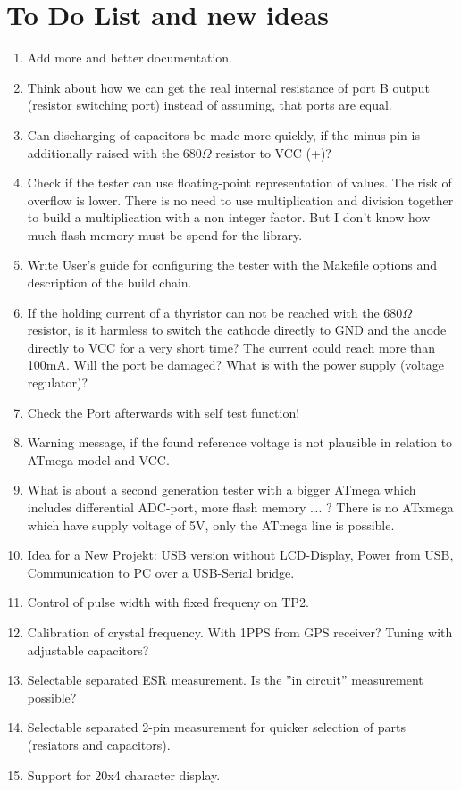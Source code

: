 
\chapter{To Do List and new ideas}
\label{sec:todo}

\begin{enumerate}
\item Add more and better documentation.
\item Think about how we can get the real internal resistance of port B output (resistor switching port) instead of assuming, that ports are equal.
\item Can discharging of capacitors be made more quickly, if the minus pin is additionally raised
with the \(680\Omega\) resistor to VCC (+)?
\item Check if the tester can use floating-point representation of  values. The risk of overflow  is lower.
There is no need to use multiplication and division together to build a multiplication with a non integer factor.
But I don't know how much flash memory must be spend for the library.
\item Write User's guide for configuring the tester with the Makefile options and description of the build chain.
\item If the holding current of a thyristor can not be reached with the \(680\Omega\) resistor, is it harmless to switch the cathode directly to GND
and the anode directly to VCC for a very short time?
The current could reach more than 100mA. Will the port be damaged? What is with the power supply (voltage regulator)?
\item Check the Port afterwards with self test function!
\item Warning message, if the found reference voltage is not plausible in relation to ATmega model and VCC.
\item What is about a second generation tester with a bigger ATmega which includes differential ADC-port, more flash memory …. ?
There is no ATxmega which have supply voltage of 5V, only the ATmega line  is possible. 
\item Idea for a New Projekt: USB  version without LCD-Display, Power from USB, Communication to PC over a USB-Serial bridge.
\item Control of pulse width with fixed frequeny on TP2.
\item Calibration of crystal frequency. With 1PPS from GPS receiver? Tuning with adjustable capacitors?
\item Selectable separated ESR measurement. Is the ''in circuit'' measurement possible?
\item Selectable separated 2-pin measurement for quicker selection of parts (resiators and capacitors).
\item Support for 20x4 character display.

\end{enumerate}
